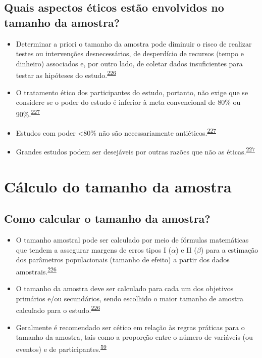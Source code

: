 \documentclass[
  a4paper,
]{book}
\begin{document}
\hypertarget{quais-aspectos-uxe9ticos-estuxe3o-envolvidos-no-tamanho-da-amostra}{%
\subsection{Quais aspectos éticos estão envolvidos no tamanho da amostra?}\label{quais-aspectos-uxe9ticos-estuxe3o-envolvidos-no-tamanho-da-amostra}}

\begin{itemize}
\item
  Determinar a priori o tamanho da amostra pode diminuir o risco de realizar testes ou intervenções desnecessários, de desperdício de recursos (tempo e dinheiro) associados e, por outro lado, de coletar dados insuficientes para testar as hipóteses do estudo.\textsuperscript{\protect\hyperlink{ref-rodruxedguezdeluxe1guila2014}{226}}
\item
  O tratamento ético dos participantes do estudo, portanto, não exige que se considere se o poder do estudo é inferior à meta convencional de 80\% ou 90\%.\textsuperscript{\protect\hyperlink{ref-Bacchetti2005}{227}}
\item
  Estudos com poder \textless80\% não são necessariamente antiéticos.\textsuperscript{\protect\hyperlink{ref-Bacchetti2005}{227}}
\item
  Grandes estudos podem ser desejáveis por outras razões que não as éticas.\textsuperscript{\protect\hyperlink{ref-Bacchetti2005}{227}}
\end{itemize}

\hypertarget{cuxe1lculo-do-tamanho-da-amostra}{%
\section{Cálculo do tamanho da amostra}\label{cuxe1lculo-do-tamanho-da-amostra}}

\hypertarget{como-calcular-o-tamanho-da-amostra}{%
\subsection{Como calcular o tamanho da amostra?}\label{como-calcular-o-tamanho-da-amostra}}

\begin{itemize}
\item
  O tamanho amostral pode ser calculado por meio de fórmulas matemáticas que tendem a assegurar margens de erros tipos I (\(\alpha\)) e II (\(\beta\)) para a estimação dos parâmetros populacionais (tamanho de efeito) a partir dos dados amostrais.\textsuperscript{\protect\hyperlink{ref-rodruxedguezdeluxe1guila2014}{226}}
\item
  O tamanho da amostra deve ser calculado para cada um dos objetivos primários e/ou secundários, sendo escolhido o maior tamanho de amostra calculado para o estudo.\textsuperscript{\protect\hyperlink{ref-rodruxedguezdeluxe1guila2014}{226}}
\item
  Geralmente é recomendado ser cético em relação às regras práticas para o tamanho da amostra, tais como a proporção entre o número de variáveis (ou eventos) e de participantes.\textsuperscript{\protect\hyperlink{ref-van2022a}{59}}
\end{itemize}
\end{document}
